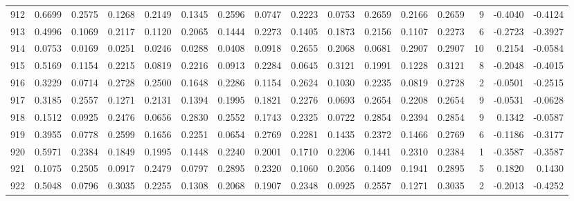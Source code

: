 \begin{tabular}{lrrrrrrrrrrrrrrr}
912 &      0.6699 &  0.2575 &  0.1268 &  0.2149 &  0.1345 &  0.2596 &  0.0747 &  0.2223 &  0.0753 &  0.2659 &   0.2166 &     0.2659 &      9 &                   -0.4040 &                    -0.4124 \\
913 &      0.4996 &  0.1069 &  0.2117 &  0.1120 &  0.2065 &  0.1444 &  0.2273 &  0.1405 &  0.1873 &  0.2156 &   0.1107 &     0.2273 &      6 &                   -0.2723 &                    -0.3927 \\
914 &      0.0753 &  0.0169 &  0.0251 &  0.0246 &  0.0288 &  0.0408 &  0.0918 &  0.2655 &  0.2068 &  0.0681 &   0.2907 &     0.2907 &     10 &                    0.2154 &                    -0.0584 \\
915 &      0.5169 &  0.1154 &  0.2215 &  0.0819 &  0.2216 &  0.0913 &  0.2284 &  0.0645 &  0.3121 &  0.1991 &   0.1228 &     0.3121 &      8 &                   -0.2048 &                    -0.4015 \\
916 &      0.3229 &  0.0714 &  0.2728 &  0.2500 &  0.1648 &  0.2286 &  0.1154 &  0.2624 &  0.1030 &  0.2235 &   0.0819 &     0.2728 &      2 &                   -0.0501 &                    -0.2515 \\
917 &      0.3185 &  0.2557 &  0.1271 &  0.2131 &  0.1394 &  0.1995 &  0.1821 &  0.2276 &  0.0693 &  0.2654 &   0.2208 &     0.2654 &      9 &                   -0.0531 &                    -0.0628 \\
918 &      0.1512 &  0.0925 &  0.2476 &  0.0656 &  0.2830 &  0.2552 &  0.1743 &  0.2325 &  0.0722 &  0.2854 &   0.2394 &     0.2854 &      9 &                    0.1342 &                    -0.0587 \\
919 &      0.3955 &  0.0778 &  0.2599 &  0.1656 &  0.2251 &  0.0654 &  0.2769 &  0.2281 &  0.1435 &  0.2372 &   0.1466 &     0.2769 &      6 &                   -0.1186 &                    -0.3177 \\
920 &      0.5971 &  0.2384 &  0.1849 &  0.1995 &  0.1448 &  0.2240 &  0.2001 &  0.1710 &  0.2206 &  0.1441 &   0.2310 &     0.2384 &      1 &                   -0.3587 &                    -0.3587 \\
921 &      0.1075 &  0.2505 &  0.0917 &  0.2479 &  0.0797 &  0.2895 &  0.2320 &  0.1060 &  0.2056 &  0.1409 &   0.1941 &     0.2895 &      5 &                    0.1820 &                     0.1430 \\
922 &      0.5048 &  0.0796 &  0.3035 &  0.2255 &  0.1308 &  0.2068 &  0.1907 &  0.2348 &  0.0925 &  0.2557 &   0.1271 &     0.3035 &      2 &                   -0.2013 &                    -0.4252 \\

\end{tabular}
